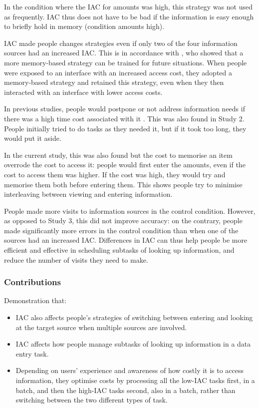 \begin{table}
\begin{enumerate}
In the condition where the IAC for amounts was high, this strategy was not used as frequently. 
IAC thus does not have to be bad if the information is easy enough to briefly hold in memory (condition amounts high).

IAC made people changes strategies even if only two of the four information sources had an increased IAC. This is in accordance with \citep{Morgan2014}, who showed that a more memory-based strategy can be trained for future situations. When people were exposed to an interface with an increased access cost, they adopted a memory-based strategy and retained this strategy, even when they then interacted with an interface with lower access costs.

In previous studies, people would postpone or not address information needs if there was a high time cost associated with it \citep{Sohn2008}. This was also found in Study 2. People initially tried to do tasks as they needed it, but if it took too long, they would put it aside.

In the current study, this was also found but the cost to memorise an item overrode the cost to access it: people would first enter the amounts, even if the cost to access them was higher.
If the cost was high, they would try and memorise them both before entering them. This shows people try to minimise interleaving between viewing and entering information. 


People made more visits to information sources in the control condition. However, as opposed to Study 3, this did not improve accuracy: on the contrary, people made significantly more errors in the control condition than when one of the sources had an increased IAC. Differences in IAC can thus help people be more efficient and effective in scheduling subtasks of looking up information, and reduce the number of visits they need to make. 


\subsubsection{Contributions}
Demonstration that:
\begin{itemize}

\item   
IAC also affects people's strategies of switching between entering and looking at the target source when multiple sources are involved.
\item
IAC affects how people manage subtasks of looking up information in a data entry task.
\item
Depending on users' experience and awareness of how costly it is to access information, they optimise costs by processing all the low-IAC tasks first, in a batch, and then the high-IAC tasks second, also in a batch, rather than switching between the two different types of task.  
\end{itemize}


\end{enumerate}
\end{table}
